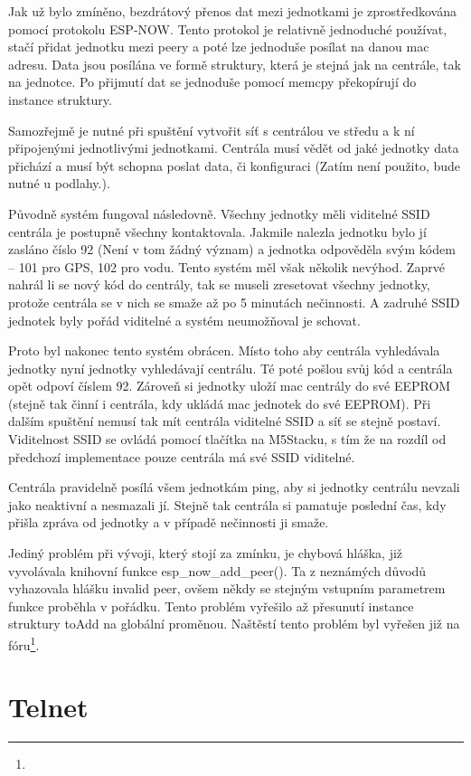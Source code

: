\documentclass[a4paper,oneside,12pt]{report}
\begin{document}
Jak už bylo zmíněno, bezdrátový přenos dat mezi jednotkami je zprostředkována pomocí protokolu ESP-NOW.
Tento protokol je relativně jednoduché používat, stačí přidat jednotku mezi peery a poté lze jednoduše posílat na danou mac adresu.
Data jsou posílána ve formě struktury, která je stejná jak na centrále, tak na jednotce.
Po přijmutí dat se jednoduše pomocí memcpy překopírují do instance struktury.

Samozřejmě je nutné při spuštění vytvořit síť s centrálou ve středu a k ní připojenými jednotlivými jednotkami.
Centrála musí vědět od jaké jednotky data přichází a musí být schopna poslat data, či konfiguraci (Zatím není použito, bude nutné u podlahy.).

Původně systém fungoval následovně.
Všechny jednotky měli viditelné SSID centrála je postupně všechny kontaktovala.
Jakmile nalezla jednotku bylo jí zasláno číslo 92 (Není v tom žádný význam) a jednotka odpověděla svým kódem -- 101 pro GPS, 102 pro vodu.
Tento systém měl však několik nevýhod.
Zaprvé nahrál li se nový kód do centrály, tak se museli zresetovat všechny jednotky, protože centrála se v nich se smaže až po 5 minutách nečinnosti.
A zadruhé SSID jednotek byly pořád viditelné a systém neumožňoval je schovat.

Proto byl nakonec tento systém obrácen.
Místo toho aby centrála vyhledávala jednotky nyní jednotky vyhledávají centrálu.
Té poté pošlou svůj kód a centrála opět odpoví číslem 92.
Zároveň si jednotky uloží mac centrály do své EEPROM (stejně tak činní i centrála, kdy ukládá mac jednotek do své EEPROM).
Při dalším spuštění nemusí tak mít centrála viditelné SSID a síť se stejně postaví.
Viditelnost SSID se ovládá pomocí tlačítka na M5Stacku, s tím že na rozdíl od předchozí implementace pouze centrála má své SSID viditelné.

Centrála pravidelně posílá všem jednotkám ping, aby si jednotky centrálu nevzali jako neaktivní a nesmazali jí.
Stejně tak centrála si pamatuje poslední čas, kdy přišla zpráva od jednotky a v případě nečinnosti ji smaže.

Jediný problém při vývoji, který stojí za zmínku, je chybová hláška, již vyvolávala knihovní funkce esp\_now\_add\_peer().
Ta z neznámých důvodů vyhazovala hlášku invalid peer, ovšem někdy se stejným vstupním parametrem funkce proběhla v pořádku.
Tento problém vyřešilo až přesunutí instance struktury toAdd na globální proměnou.
Naštěstí tento problém byl vyřešen již na fóru\footnote{}.

\section{Telnet}
\end{document}
